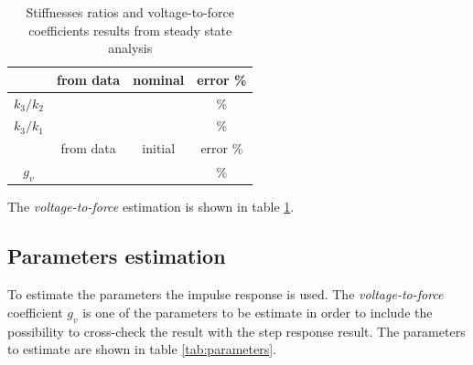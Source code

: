 \documentclass[twosided,a4paper]{article}           %
\begin{document}
\begin{table}[H]
	\centering
	\begin{tabular}{|c|c|c|c|}
		\hline 
		 & from data & nominal & error \% \\ 
		\hline 
		$k_3/k_2$ & &  & \%  \\ 
		\hline 
		$k_3/k_1$ & &  & \% \\
		\hline \hline
		      & from data              & initial & error 
		      \%\\
		\hline
		$g_v$ &  &  & \% \\\hline
	\end{tabular} 
	\label{tab:ratios}
	\caption{Stiffnesses ratios and voltage-to-force coefficients results from steady state analysis}
\end{table}
The \textit{voltage-to-force} estimation is shown in table \ref{tab:ratios}.
\subsection{Parameters estimation}
To estimate the parameters the impulse response is used. The \textit{voltage-to-force} coefficient $g_v$ is one of the parameters to be estimate in order to include the possibility to cross-check the result with the step response result.
The parameters to estimate are shown in table \ref{tab:parameters}.
\end{document}
